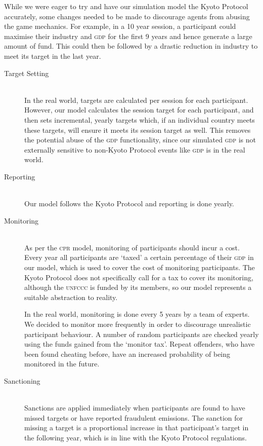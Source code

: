 While we were eager to try and have our simulation model the Kyoto Protocol accurately, some changes needed to be made to discourage agents from abusing the game mechanics. For example, in a 10 year session, a participant could maximise their industry and \textsc{gdp} for the first 9 years and hence generate a large amount of fund. This could then be followed by a drastic reduction in industry to meet its target in the last year.

\begin{description}
\item [Target Setting] \hfill \\ 
In the real world, targets are calculated per session for each participant. However, our model calculates the session target for each participant, and then sets incremental, yearly targets which, if an individual country meets these targets, will ensure it meets its session target as well. This removes the potential abuse of the \textsc{gdp} functionality, since our simulated \textsc{gdp} is not externally sensitive to non-Kyoto Protocol events like \textsc{gdp} is in the real world.

\item [Reporting] \hfill \\ 
Our model follows the Kyoto Protocol and reporting is done yearly.

\item [Monitoring] \hfill \\ 
As per the \textsc{cpr} model, monitoring of participants should incur a cost. Every year all participants are `taxed' a certain percentage of their \textsc{gdp} in our model, which is used to cover the cost of monitoring participants. The Kyoto Protocol does not specifically call for a tax to cover its monitoring, although the \textsc{unfccc} is funded by its members, so our model represents a suitable abstraction to reality.

In the real world, monitoring is done every 5 years by a team of experts. We decided to monitor more frequently in order to discourage unrealistic participant behaviour. A number of random participants are checked yearly using the funds gained from the `monitor tax'. Repeat offenders, who have been found cheating before, have an increased probability of being monitored in the future.

\item [Sanctioning] \hfill \\ 
Sanctions are applied immediately when participants are found to have missed targets or have reported fraudulent emissions. The sanction for missing a target is a proportional increase in that participant's target in the following year, which is in line with the Kyoto Protocol regulations.


\end{description}
